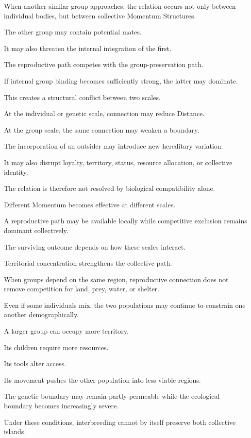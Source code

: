 When another similar group approaches, the relation occurs not only between individual bodies, but between collective Momentum Structures.

The other group may contain potential mates.

It may also threaten the internal integration of the first.

The reproductive path competes with the group-preservation path.

If internal group binding becomes sufficiently strong, the latter may dominate.

This creates a structural conflict between two scales.

At the individual or genetic scale, connection may reduce Distance.

At the group scale, the same connection may weaken a boundary.

The incorporation of an outsider may introduce new hereditary variation.

It may also disrupt loyalty, territory, status, resource allocation, or collective identity.

The relation is therefore not resolved by biological compatibility alone.

Different Momentum becomes effective at different scales.

A reproductive path may be available locally while competitive exclusion remains dominant collectively.

The surviving outcome depends on how these scales interact.

Territorial concentration strengthens the collective path.

When groups depend on the same region, reproductive connection does not remove competition for land, prey, water, or shelter.

Even if some individuals mix, the two populations may continue to constrain one another demographically.

A larger group can occupy more territory.

Its children require more resources.

Its tools alter access.

Its movement pushes the other population into less viable regions.

The genetic boundary may remain partly permeable while the ecological boundary becomes increasingly severe.

Under these conditions, interbreeding cannot by itself preserve both collective islands.

